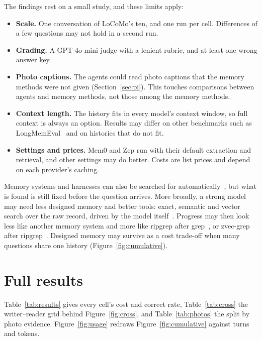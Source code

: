 \documentclass[11pt]{article}
\begin{document}
The findings rest on a small study, and these limits apply:
\begin{itemize}
\item \textbf{Scale.} One conversation of LoCoMo's ten, and one run per cell. Differences of a few questions may not hold in a second run.
\item \textbf{Grading.} A GPT-4o-mini judge with a lenient rubric, and at least one wrong answer key.
\item \textbf{Photo captions.} The agents could read photo captions that the memory methods were not given (Section~\ref{sec:pi}). This touches comparisons between agents and memory methods, not those among the memory methods.
\item \textbf{Context length.} The history fits in every model's context window, so full context is always an option. Results may differ on other benchmarks such as LongMemEval~\citep{wu2024longmemeval} and on histories that do not fit.
\item \textbf{Settings and prices.} Mem0 and Zep run with their default extraction and retrieval, and other settings may do better. Costs are list prices and depend on each provider's caching.
\end{itemize}

Memory systems and harnesses can also be searched for automatically~\citep{zhang2025memevolve,lee2026metaharness}, but what is found is still fixed before the question arrives. More broadly, a strong model may need less designed memory and better tools: exact, semantic and vector search over the raw record, driven by the model itself~\citep{pi2026,codex2026}. Progress may then look less like another memory system and more like ripgrep after grep~\citep{gallant2016ripgrep}, or zvec-grep after ripgrep~\citep{zvec2026zg}. Designed memory may survive as a cost trade-off when many questions share one history (Figure~\ref{fig:cumulative}).





\appendix

\section{Full results}
\label{app:results}

Table~\ref{tab:results} gives every cell's cost and correct rate, Table~\ref{tab:cross} the writer--reader grid behind Figure~\ref{fig:cross}, and Table~\ref{tab:photos} the split by photo evidence. Figure~\ref{fig:usage} redraws Figure~\ref{fig:cumulative} against turns and tokens.
\end{document}
